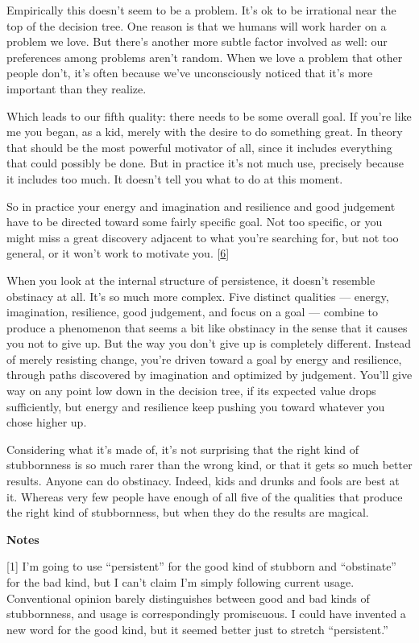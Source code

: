 Empirically this doesn't seem to be a problem. It's ok to be irrational
near the top of the decision tree. One reason is that we humans will
work harder on a problem we love. But there's another more subtle factor
involved as well: our preferences among problems aren't random. When we
love a problem that other people don't, it's often because we've
unconsciously noticed that it's more important than they realize.

Which leads to our fifth quality: there needs to be some overall goal.
If you're like me you began, as a kid, merely with the desire to do
something great. In theory that should be the most powerful motivator of
all, since it includes everything that could possibly be done. But in
practice it's not much use, precisely because it includes too much. It
doesn't tell you what to do at this moment.

So in practice your energy and imagination and resilience and good
judgement have to be directed toward some fairly specific goal. Not too
specific, or you might miss a great discovery adjacent to what you're
searching for, but not too general, or it won't work to motivate you.
{[}\hyperref[f6n]{6}{]}

When you look at the internal structure of persistence, it doesn't
resemble obstinacy at all. It's so much more complex. Five distinct
qualities --- energy, imagination, resilience, good judgement, and focus
on a goal --- combine to produce a phenomenon that seems a bit like
obstinacy in the sense that it causes you not to give up. But the way
you don't give up is completely different. Instead of merely resisting
change, you're driven toward a goal by energy and resilience, through
paths discovered by imagination and optimized by judgement. You'll give
way on any point low down in the decision tree, if its expected value
drops sufficiently, but energy and resilience keep pushing you toward
whatever you chose higher up.

Considering what it's made of, it's not surprising that the right kind
of stubbornness is so much rarer than the wrong kind, or that it gets so
much better results. Anyone can do obstinacy. Indeed, kids and drunks
and fools are best at it. Whereas very few people have enough of all
five of the qualities that produce the right kind of stubbornness, but
when they do the results are magical.

\textbf{Notes}

{[}1{]} I'm going to use ``persistent'' for the good kind of stubborn
and ``obstinate'' for the bad kind, but I can't claim I'm simply
following current usage. Conventional opinion barely distinguishes
between good and bad kinds of stubbornness, and usage is correspondingly
promiscuous. I could have invented a new word for the good kind, but it
seemed better just to stretch ``persistent.''

